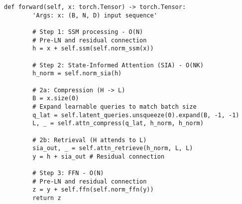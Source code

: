 \documentclass[10pt,twocolumn,letterpaper]{article}
\begin{document}
\begin{lstlisting}[style=pytorchstyle, caption={PyTorch-style pseudocode for the LST Block.}, label=lst:code_block]
    def forward(self, x: torch.Tensor) -> torch.Tensor:
        'Args: x: (B, N, D) input sequence'

        # Step 1: SSM processing - O(N)
        # Pre-LN and residual connection
        h = x + self.ssm(self.norm_ssm(x))

        # Step 2: State-Informed Attention (SIA) - O(NK)
        h_norm = self.norm_sia(h)

        # 2a: Compression (H -> L)
        B = x.size(0)
        # Expand learnable queries to match batch size
        q_lat = self.latent_queries.unsqueeze(0).expand(B, -1, -1)
        L, _ = self.attn_compress(q_lat, h_norm, h_norm)

        # 2b: Retrieval (H attends to L)
        sia_out, _ = self.attn_retrieve(h_norm, L, L)
        y = h + sia_out # Residual connection

        # Step 3: FFN - O(N)
        # Pre-LN and residual connection
        z = y + self.ffn(self.norm_ffn(y))
        return z
\end{lstlisting}
\end{document}
